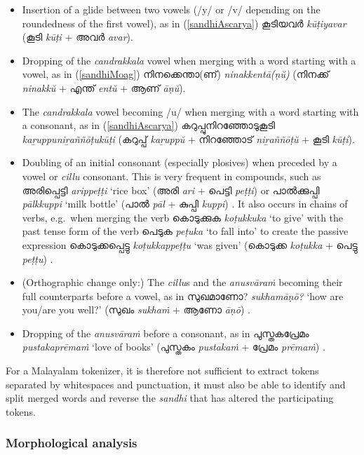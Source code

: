 \documentclass[a4paper]{article}
\begin{document}
\begin{itemize}
\item Insertion of a glide between two vowels (/y/ or /v/ depending on the roundedness of the first vowel), as in (\ref{sandhiAscarya}) കൂടിയവർ \textit{kūṭiyavar} (കൂടി \textit{kūṭi} + അവർ \textit{avar}).
\item Dropping of the \textit{candrakkala} vowel when merging with a word starting with a vowel, as in (\ref{sandhiMoag}) നിനക്കെന്താ(ണ്) \textit{ninakkentā(ṇŭ)} (നിനക്ക് \textit{ninakkŭ} + എന്ത് \textit{entŭ} + ആണ് \textit{āṇŭ}).
\item The \textit{candrakkala} vowel becoming /u/ when merging with a word starting with a consonant, as in (\ref{sandhiAscarya}) കറുപ്പുനിറഞ്ഞോടുകൂടി \textit{kaṟuppuniṟaññōṭukūṭi} (കറുപ്പ് \textit{kaṟuppŭ} + നിറഞ്ഞോട് \textit{niṟaññōṭŭ} + കൂടി \textit{kūṭi}).
\item Doubling of an initial consonant (especially plosives) when preceded by a vowel or \textit{cillu} consonant. This is very frequent in compounds, such as അരിപ്പെട്ടി \textit{arippeṭṭi} `rice box' (അരി \textit{ari} + പെട്ടി \textit{peṭṭi}) or പാൽക്കുപ്പി \textit{pālkkuppi} `milk bottle' (പാൽ \textit{pāl} + കുപ്പി \textit{kuppi}) \parencite[p.~397]{asherKumari}. It also occurs in chains of verbs, e.g.\ when merging the verb കൊടുക്കുക \textit{koṭukkuka} `to give' with the past tense form of the verb പെടുക \textit{peṭuka} `to fall into' to create the passive expression കൊടുക്കപ്പെട്ടു \textit{koṭukkappeṭṭu} `was given' (കൊടുക്ക \textit{koṭukka} + പെട്ടു \textit{peṭṭu}) \parencite[p.~269]{asherKumari}.
\item (Orthographic change only:) The \textit{cillu}s and the \textit{anusvāraṁ} becoming their full counterparts before a vowel, as in സുഖമാണോ? \textit{sukhamāṇō?} `how are you/are you well?' (സുഖം \textit{sukhaṁ} + ആണോ \textit{āṇō}) \parencite[p.~30]{moag}.
\item Dropping of the \textit{anusvāraṁ} before a consonant, as in പുസ്തകപ്രേമം \textit{pustakaprēmaṁ} `love of books' (പുസ്തകം \textit{pustakaṁ} + പ്രേമം \textit{prēmaṁ}) \parencite[p.~398]{asherKumari}.
\end{itemize}

For a Malayalam tokenizer, it is therefore not sufficient to extract tokens separated by whitespaces and punctuation, it must also be able to identify and split merged words and reverse the \textit{sandhi} that has altered the participating tokens.

\subsubsection{Morphological analysis}
\end{document}
